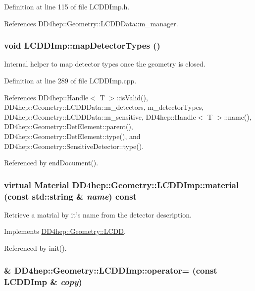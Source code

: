 Definition at line 115 of file LCDDImp.h.

References DD4hep::Geometry::LCDDData::m\_\-manager.\hypertarget{class_d_d4hep_1_1_geometry_1_1_l_c_d_d_imp_ade5422f804607ee686022a4a05bd3cff}{
\subsubsection[{mapDetectorTypes}]{\setlength{\rightskip}{0pt plus 5cm}void LCDDImp::mapDetectorTypes ()}}
\label{class_d_d4hep_1_1_geometry_1_1_l_c_d_d_imp_ade5422f804607ee686022a4a05bd3cff}


Internal helper to map detector types once the geometry is closed. 

Definition at line 289 of file LCDDImp.cpp.

References DD4hep::Handle$<$ T $>$::isValid(), DD4hep::Geometry::LCDDData::m\_\-detectors, m\_\-detectorTypes, DD4hep::Geometry::LCDDData::m\_\-sensitive, DD4hep::Handle$<$ T $>$::name(), DD4hep::Geometry::DetElement::parent(), DD4hep::Geometry::DetElement::type(), and DD4hep::Geometry::SensitiveDetector::type().

Referenced by endDocument().\hypertarget{class_d_d4hep_1_1_geometry_1_1_l_c_d_d_imp_acd3ac5d06042d6c1adda04ef5a974b62}{
\subsubsection[{material}]{\setlength{\rightskip}{0pt plus 5cm}virtual {\bf Material} DD4hep::Geometry::LCDDImp::material (const std::string \& {\em name}) const}}
\label{class_d_d4hep_1_1_geometry_1_1_l_c_d_d_imp_acd3ac5d06042d6c1adda04ef5a974b62}


Retrieve a matrial by it's name from the detector description. 

Implements \hyperlink{class_d_d4hep_1_1_geometry_1_1_l_c_d_d_aec8adc99bc62ade78afd0a444a76fd04}{DD4hep::Geometry::LCDD}.

Referenced by init().\hypertarget{class_d_d4hep_1_1_geometry_1_1_l_c_d_d_imp_a429b6797c934059cab5109ab882f9e81}{
\subsubsection[{operator=}]{\& DD4hep::Geometry::LCDDImp::operator= (const {\bf LCDDImp} \& {\em copy})}}
\label{class_d_d4hep_1_1_geometry_1_1_l_c_d_d_imp_a429b6797c934059cab5109ab882f9e81}


